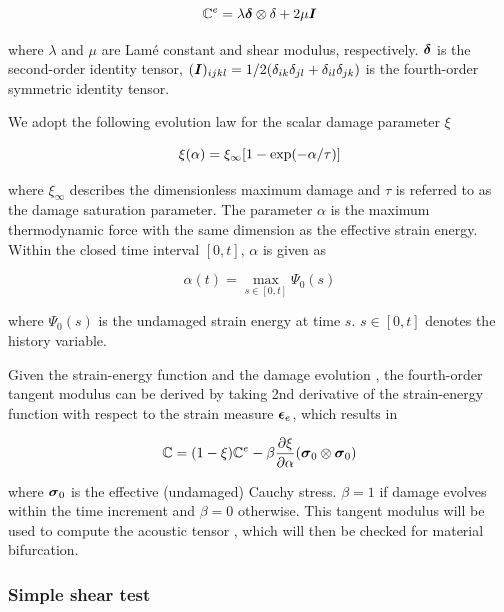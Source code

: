 \documentclass[12pt]{article}
\numberwithin{equation}{section}
\begin{document}
\begin{equation}
  \mathbb{C}^e = \lambda {\boldsymbol{\delta}}\otimes\delta + 2\mu{\boldsymbol{I}}
\end{equation}

where $\lambda$ and $\mu$ are Lam\'{e} constant and shear modulus,
respectively. ${\boldsymbol{\delta}}$ is the second-order identity tensor,
$({\boldsymbol{I}})_{ijkl} = 1/2(\delta_{ik}\delta_{jl} +
\delta_{il}\delta_{jk})$ is the fourth-order symmetric identity
tensor.

We adopt the following evolution law for the scalar damage parameter $
\xi$ \cite{Holzapfel:2000}

\begin{equation}\label{eq:iso_xi}
  \xi(\alpha) = \xi_{\infty} [ 1- {\rm exp}(-\alpha / \tau)]
\end{equation}

where $\xi_{\infty}$ describes the dimensionless maximum damage and
$\tau$ is referred to as the damage saturation parameter. The 
parameter $\alpha$ is the maximum thermodynamic force 
\cite{Holzapfel:2000} with the same dimension as the effective strain 
energy. Within the closed time interval $[0,t]$, $\alpha$ is given as

\begin{equation}
  \alpha(t) = \max_{s\in [0,t]}\Psi_0(s)
\end{equation}

where $\Psi_0(s)$ is the undamaged strain energy at time $s$.
$s \in [0,t]$ denotes the history variable.

Given the strain-energy function  and the damage
evolution , the fourth-order tangent modulus can be
derived by taking 2nd derivative of the strain-energy function with
respect to the strain measure ${\boldsymbol{\epsilon}}_e$, which results in

\begin{equation}
  \mathbb{C} = (1-\xi)\mathbb{C}^e 
    - \beta \frac{\partial\xi}{\partial\alpha}
    ({\boldsymbol{\sigma}}_0\otimes{\boldsymbol{\sigma}}_0)
\end{equation}

where ${\boldsymbol{\sigma}}_0$ is the effective (undamaged) Cauchy stress. 
$\beta = 1$ if damage evolves within the time increment and $\beta=0$ 
otherwise. This tangent modulus will be used to compute the acoustic 
tensor , which will then be checked for 
material bifurcation.

\subsubsection{Simple shear test}
\end{document}
